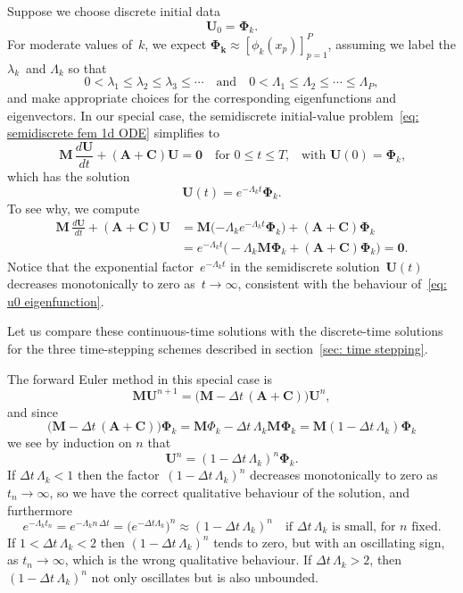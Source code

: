 Suppose we choose discrete initial data
\[
\boldsymbol{U}_0=\boldsymbol{\Phi}_k.
\]
For moderate values of~$k$, we expect 
$\boldsymbol{\Phi_k}\approx[\phi_k(x_p)]_{p=1}^P$, assuming we label the 
$\lambda_k$~and $\Lambda_k$ so that
\[
0<\lambda_1\le\lambda_2\le\lambda_3\le\cdots
\quad\text{and}\quad
0<\Lambda_1\le\Lambda_2\le\cdots\le\Lambda_P,
\]
and make appropriate choices for the corresponding eigenfunctions and 
eigenvectors. In our special case, the semidiscrete initial-value 
problem~\eqref{eq: semidiscrete fem 1d ODE} simplifies to
\[
\boldsymbol{M}\,\frac{d\boldsymbol{U}}{dt}
+(\boldsymbol{A}+\boldsymbol{C})\boldsymbol{U}=\boldsymbol{0}
    \quad\text{for $0\le t\le T$,}
    \quad\text{with $\boldsymbol{U}(0)=\boldsymbol{\Phi}_k$,}
\]
which has the solution
\begin{equation}
\boldsymbol{U}(t)=e^{-\Lambda_kt}\boldsymbol{\Phi}_k.
\end{equation}
To see why, we compute
\begin{align*}
\boldsymbol{M}\,\frac{d\boldsymbol{U}}{dt}
+(\boldsymbol{A}+\boldsymbol{C})\boldsymbol{U}
    &=\boldsymbol{M}(-\Lambda_ke^{-\Lambda_kt}\boldsymbol{\Phi}_k\bigr)
    +(\boldsymbol{A}+\boldsymbol{C})\boldsymbol{\Phi}_k\\
&=e^{-\Lambda_kt}\bigl(-\Lambda_k\boldsymbol{M}\boldsymbol{\Phi}_k
    +(\boldsymbol{A}+\boldsymbol{C})\boldsymbol{\Phi}_k\bigr)=\boldsymbol{0}.
\end{align*}
Notice that the exponential factor~$e^{-\Lambda_kt}$ in the semidiscrete 
solution~$\boldsymbol{U}(t)$ decreases monotonically to zero as~$t\to\infty$,
consistent with the behaviour of~\eqref{eq: u0 eigenfunction}.

Let us compare these continuous-time solutions with the discrete-time 
solutions for the three time-stepping schemes described in 
section~\ref{sec: time stepping}.  

\begin{example}
The forward Euler method in this special case is
\[
\boldsymbol{M}\boldsymbol{U}^{n+1}=\bigl(\boldsymbol{M}
-\Delta t\,(\boldsymbol{A}+\boldsymbol{C})\bigr)\boldsymbol{U}^n,
\]
and since
\[
\bigl(\boldsymbol{M} 
-\Delta t\,(\boldsymbol{A}+\boldsymbol{C})\bigr)\boldsymbol{\Phi}_k
    =\boldsymbol{M}\Phi_k-\Delta t\,\Lambda_k\boldsymbol{M}\boldsymbol{\Phi}_k
    =\boldsymbol{M}(1-\Delta t\,\Lambda_k)\boldsymbol{\Phi}_k
\]
we see by induction on $n$ that
\[
\boldsymbol{U}^n=(1-\Delta t\,\Lambda_k)^n\boldsymbol{\Phi}_k.
\]
If $\Delta t\,\Lambda_k<1$ then the factor~$(1-\Delta t\,\Lambda_k)^n$ 
decreases monotonically to zero as~$t_n\to\infty$, so we have the correct 
qualitative behaviour of the solution, and furthermore
\[
e^{-\Lambda_kt_n}=e^{-\Lambda_k n\,\Delta t}
    =\bigl(e^{-\Delta t\Lambda_k}\bigr)^n\approx(1-\Delta t\,\Lambda_k)^n
    \quad\text{if $\Delta t\,\Lambda_k$ is small, for $n$ fixed.}
\]
If $1<\Delta t\,\Lambda_k<2$ then $(1-\Delta t\,\Lambda_k)^n$ tends to zero, 
but with an oscillating sign, as $t_n\to\infty$, which is the wrong qualitative 
behaviour. If $\Delta t\,\Lambda_k>2$, then $(1-\Delta t\,\Lambda_k)^n$ not 
only oscillates but is also unbounded.
\end{example}

